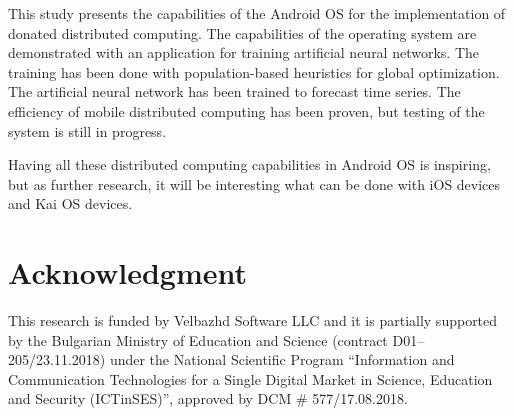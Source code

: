 \documentclass[a4paper,conference]{IEEEtran}
\begin{document}
This study presents the capabilities of the Android OS for the implementation of donated distributed computing. The capabilities of the operating system are demonstrated with an application for training artificial neural networks. The training has been done with population-based heuristics for global optimization. The artificial neural network has been trained to forecast time series. The efficiency of mobile distributed computing has been proven, but testing of the system is still in progress. 

Having all these distributed computing capabilities in Android OS is inspiring, but as further research, it will be interesting what can be done with iOS devices and Kai OS devices. 

\section*{Acknowledgment}

This research is funded by Velbazhd Software LLC and it is partially supported by the Bulgarian Ministry of Education and Science (contract D01–205/23.11.2018) under the National Scientific Program ``Information and Communication Technologies for a Single Digital Market in Science, Education and Security (ICTinSES)'', approved by DCM \# 577/17.08.2018.
\end{document}
